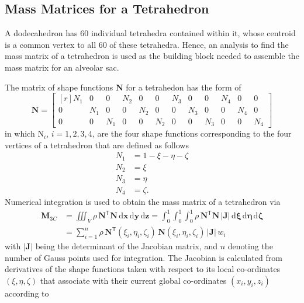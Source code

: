 \subsection{Mass Matrices for a Tetrahedron}

A dodecahedron has 60 individual tetrahedra contained within it, whose centroid is a common vertex to all 60 of these tetrahedra. Hence, an analysis to find the mass matrix of a tetrahedron is used as the building block needed to assemble the mass matrix for an alveolar sac.

The matrix of shape functions $\mathbf{N}$ for a tetrahedon has the form of
\begin{equation}
	\mathbf{N} =  
\begin{bmatrix*}[r]
	N_1 & 0 & 0 & N_2 & 0 & 0 & N_3 & 0 & 0 & N_4 & 0 & 0 \\
	0 & N_1 & 0 & 0 & N_2 & 0 & 0 & N_3 & 0 & 0 & N_4 & 0 \\
	0 & 0 & N_1 & 0 & 0 & N_2 & 0 & 0 & N_3 & 0 & 0 & N_4
\end{bmatrix*} 
	\label{shape3D}
\end{equation}
in which $\mathrm{N}_i$, $i = 1, 2, 3, 4$, are the four shape functions corresponding to the four vertices of a tetrahedron that are defined as follows
\begin{subequations}
\begin{align}
	N_1 & = 1 - \xi - \eta - \zeta \\
	N_2 & = \xi \\
	N_3 & = \eta \\
	N_4 & = \zeta .
\end{align}
\end{subequations}
Numerical integration is used to obtain the mass matrix of a tetrahedron via
\begin{equation}
    \begin{aligned}
    \mathbf{M}_{3C} & = \iiint_V \rho \, \mathbf{N}^{\mathsf{T}} \mathbf{N} \, \mathrm{d} \mathbf{x} \, \mathrm{d} \mathbf{y} \, \mathrm{d} \mathbf{z} = \int_0^1 \int_0^1 \int_0^1 \rho \, \mathbf{N}^{\mathsf{T}} \mathbf{N} \, | \mathbf{J} | \, \mathrm{d} \mathbf{\xi} \, \mathrm{d} \mathbf{\eta} \, \mathrm{d} \mathbf{\zeta} \\ & = \sum_{i=1}^n \rho \, \mathbf{N}^{\mathsf{T}} ( \xi_i , \eta_i , \zeta_i ) \, \mathbf{N} (\xi_i , \eta_i , \zeta_i ) \,|\mathbf{J}| \, w_i
    \end{aligned}
\end{equation}
with $|\mathbf{J}|$ being the determinant of the Jacobian matrix, and $n$ denoting the number of Gauss points used for integration.  The Jacobian is calculated from derivatives of the shape functions taken with respect to its local co-ordinates $(\xi, \eta, \zeta)$ that associate with their current global co-ordinates $(x_i, y_i, z_i)$ according to
